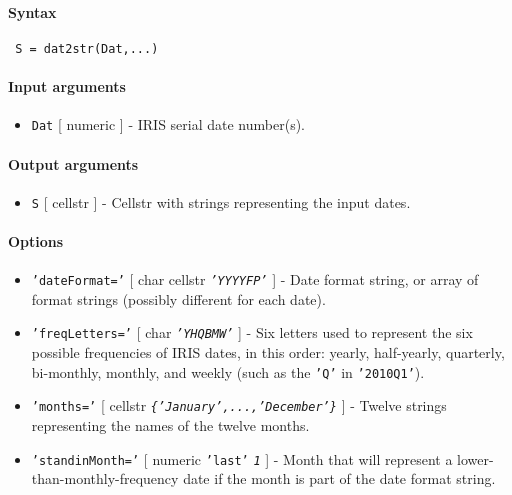 


	\paragraph{Syntax}
 
 \begin{verbatim}
 S = dat2str(Dat,...)
 \end{verbatim}
 
 \paragraph{Input arguments}
 
 \begin{itemize}
 \item
   \texttt{Dat} {[} numeric {]} - IRIS serial date number(s).
 \end{itemize}
 
 \paragraph{Output arguments}
 
 \begin{itemize}
 \item
   \texttt{S} {[} cellstr {]} - Cellstr with strings representing the
   input dates.
 \end{itemize}
 
 \paragraph{Options}
 
 \begin{itemize}
 \item
   \texttt{'dateFormat='} {[} char \textbar{} cellstr \textbar{}
   \emph{\texttt{'YYYYFP'}} {]} - Date format string, or array of format
   strings (possibly different for each date).
 \item
   \texttt{'freqLetters='} {[} char \textbar{} \emph{\texttt{'YHQBMW'}}
   {]} - Six letters used to represent the six possible frequencies of
   IRIS dates, in this order: yearly, half-yearly, quarterly, bi-monthly,
   monthly, and weekly (such as the \texttt{'Q'} in \texttt{'2010Q1'}).
 \item
   \texttt{'months='} {[} cellstr \textbar{}
   \emph{\texttt{\{'January',...,'December'\}}} {]} - Twelve strings
   representing the names of the twelve months.
 \item
   \texttt{'standinMonth='} {[} numeric \textbar{} \texttt{'last'}
   \textbar{} \emph{\texttt{1}} {]} - Month that will represent a
   lower-than-monthly-frequency date if the month is part of the date
   format string.
 \end{itemize}
 
